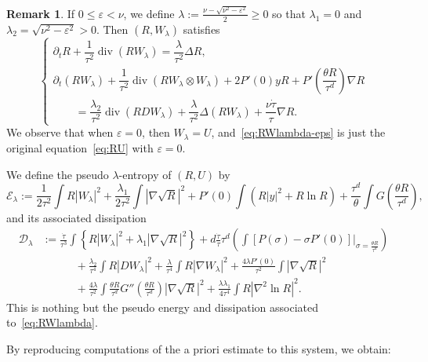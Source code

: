 \documentclass[10pt]{amsart}
\theoremstyle{definition}\newtheorem{defi}[theo]{Definition}\newtheorem{rema}[theo]{Remark}\newtheorem{exam}[theo]{Example}\newtheorem{exem}[theo]{Example}\newtheorem{nota}[theo]{Notation}
\DeclareMathOperator{\DIV}{div}
\newcommand*\<{\left\langle}
\renewcommand*\>{\right\rangle}
\renewcommand*\le{\leqslant}
\renewcommand*\ge{\geqslant}
\newcommand*\eps{\varepsilon}
\begin{document}
\begin{rema}\label{rem:RWlambda-eps}
If $0 \le \eps < \nu$, we define $\lambda := \frac{\nu - \sqrt{\nu^2 - \eps^2}}{2} \ge 0$ so that $\lambda_1 = 0$ and $\lambda_2 = \sqrt{\nu^2 - \eps^2} >0$. Then $(R, W_{\lambda})$ satisfies
\begin{equation}\label{eq:RWlambda-eps}
\begin{cases}
\partial_t R + \dfrac{1}{\tau^2}\DIV(R W_{\lambda})=\dfrac{\lambda}{\tau^2} \Delta R,\\
\partial_t (R W_{\lambda}) + \dfrac{1}{\tau^2} \DIV (R W_{\lambda} \otimes W_{\lambda}) + 2 P'(0) y R + P' \left(\dfrac{\theta R}{\tau^d} \right) \nabla R \\
\qquad = \dfrac{\lambda_2}{\tau^2} \DIV(R D W_{\lambda}) +\dfrac{\lambda}{\tau^2} \Delta(R W_{\lambda}) + \dfrac{\nu \dot \tau}{\tau}\nabla R.
\end{cases}
\end{equation}
We observe that when $\eps = 0$, then $W_{\lambda} = U$, and~\eqref{eq:RWlambda-eps} is just the original equation~\eqref{eq:RU} with $\eps = 0$.
\end{rema}

We define the pseudo $\lambda$-entropy of $(R,U)$ by
\begin{equation*}
\mathcal E_\lambda :=
\frac{1}{2\tau^2}\int R|W_\lambda|^2 +\frac{\lambda_1}{2\tau^2} \int|\nabla \sqrt R|^2 + P'(0)\int (R|y|^2 + R \ln R) + \frac{\tau^d}{\theta}\int G\left(\frac{\theta R}{\tau^d}\right),
\end{equation*}
and its associated dissipation
\begin{align*}
\mathcal D_\lambda &:= \frac{\dot \tau}{\tau^3}\int \left\{ R |W_\lambda|^2 + \lambda_1 |\nabla \sqrt R|^2 \right\} + d\frac{\dot \tau}{\tau} \tau^d \left(\int \left[P\left(\sigma\right) -\sigma P'(0) \right] \big|_{\sigma= \frac{\theta R}{\tau^d}} \right) \\
&\qquad\quad + \frac{\lambda_2}{\tau^4} \int R |D W_\lambda|^2 + \frac{\lambda}{\tau^4} \int R |\nabla W_\lambda|^2 + \frac{4\lambda P'(0)}{\tau^2} \int |\nabla \sqrt R|^2 \\
&\qquad\quad + \frac{4\lambda}{\tau^2} \int \frac{\theta R}{\tau^d} G'' \left(\tfrac{\theta R}{\tau^d} \right) |\nabla \sqrt R|^2 + \frac{\lambda \lambda_1}{4 \tau^4} \int R |\nabla^2 \ln R |^2.
\end{align*}
This is nothing but the pseudo energy and dissipation associated to~\eqref{eq:RWlambda}.

By reproducing computations of the a priori estimate to this system, we obtain:
\end{document}
